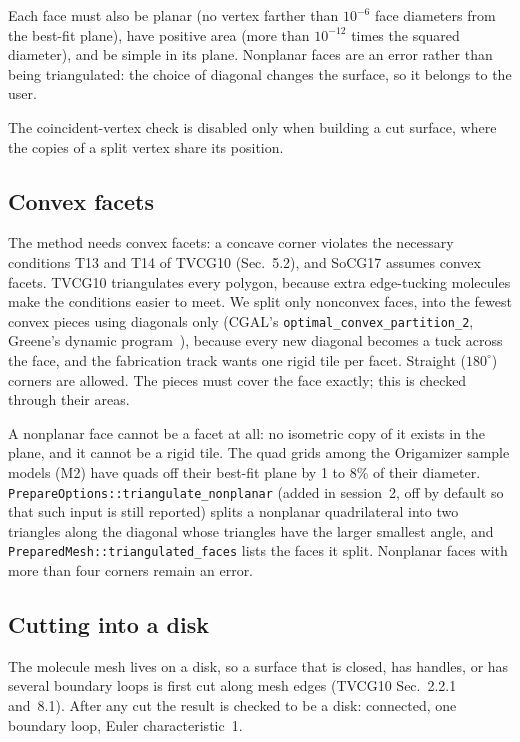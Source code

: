 \documentclass[11pt]{article}
\theoremstyle{definition}
\begin{document}
Each face must also be planar (no vertex farther than $10^{-6}$ face diameters
from the best-fit plane), have positive area (more than $10^{-12}$ times the
squared diameter), and be simple in its plane. Nonplanar faces are an error
rather than being triangulated: the choice of diagonal changes the surface, so
it belongs to the user.

The coincident-vertex check is disabled only when building a cut surface,
where the copies of a split vertex share its position.

\subsection{Convex facets}

The method needs convex facets: a concave corner violates the necessary
conditions T13 and T14 of TVCG10 (Sec.~5.2), and SoCG17 assumes convex facets.
TVCG10 triangulates every polygon, because extra edge-tucking molecules make
the conditions easier to meet. We split only nonconvex faces, into the fewest
convex pieces using diagonals only (CGAL's \texttt{optimal\_convex\_partition\_2},
Greene's dynamic program~\cite{greene83}), because every new diagonal becomes a
tuck across the face, and the fabrication track wants one rigid tile per facet.
Straight ($180^\circ$) corners are allowed. The pieces must cover the face
exactly; this is checked through their areas.

A nonplanar face cannot be a facet at all: no isometric copy of it exists in
the plane, and it cannot be a rigid tile. The quad grids among the Origamizer
sample models (M2) have quads off their best-fit plane by 1 to 8\% of their
diameter. \texttt{PrepareOptions::triangulate\_nonplanar} (added in session~2,
off by default so that such input is still reported) splits a nonplanar
quadrilateral into two triangles along the diagonal whose triangles have the
larger smallest angle, and \texttt{PreparedMesh::triangulated\_faces} lists
the faces it split. Nonplanar faces with more than four corners remain an
error.

\subsection{Cutting into a disk}

The molecule mesh lives on a disk, so a surface that is closed, has handles, or
has several boundary loops is first cut along mesh edges (TVCG10 Sec.~2.2.1
and~8.1). After any cut the result is checked to be a disk: connected, one
boundary loop, Euler characteristic~1.
\end{document}
